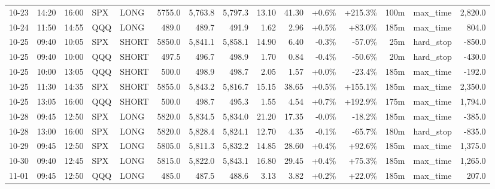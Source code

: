 \documentclass[11pt,a4paper,twoside]{article}
\begin{document}
\begin{landscape}
\begin{center}
\begin{longtable}{>{\color{txtmain}}l l l l l r r r r r r r r >{\color{txtmain}}l r}
10-23 & 14:20 & 16:00 & SPX & LONG & 5755.0 & 5,763.8 & 5,797.3 & 13.10 & 41.30 & \textcolor{wingreen}{+0.6\%} & \textcolor{wingreen}{+215.3\%} & 100m & max\_time & \textcolor{wingreen}{2,820.0} \\
10-24 & 11:50 & 14:55 & QQQ & LONG & 489.0 & 489.7 & 491.9 & 1.62 & 2.96 & \textcolor{wingreen}{+0.5\%} & \textcolor{wingreen}{+83.0\%} & 185m & max\_time & \textcolor{wingreen}{804.0} \\
10-25 & 09:40 & 10:05 & SPX & SHORT & 5850.0 & 5,841.1 & 5,858.1 & 14.90 & 6.40 & \textcolor{lossred}{-0.3\%} & \textcolor{lossred}{-57.0\%} & 25m & hard\_stop & \textcolor{lossred}{-850.0} \\
10-25 & 09:40 & 10:00 & QQQ & SHORT & 497.5 & 496.7 & 498.9 & 1.70 & 0.84 & \textcolor{lossred}{-0.4\%} & \textcolor{lossred}{-50.6\%} & 20m & hard\_stop & \textcolor{lossred}{-430.0} \\
10-25 & 10:00 & 13:05 & QQQ & SHORT & 500.0 & 498.9 & 498.7 & 2.05 & 1.57 & \textcolor{wingreen}{+0.0\%} & \textcolor{lossred}{-23.4\%} & 185m & max\_time & \textcolor{lossred}{-192.0} \\
10-25 & 11:30 & 14:35 & SPX & SHORT & 5855.0 & 5,843.2 & 5,816.7 & 15.15 & 38.65 & \textcolor{wingreen}{+0.5\%} & \textcolor{wingreen}{+155.1\%} & 185m & max\_time & \textcolor{wingreen}{2,350.0} \\
10-25 & 13:05 & 16:00 & QQQ & SHORT & 500.0 & 498.7 & 495.3 & 1.55 & 4.54 & \textcolor{wingreen}{+0.7\%} & \textcolor{wingreen}{+192.9\%} & 175m & max\_time & \textcolor{wingreen}{1,794.0} \\
10-28 & 09:45 & 12:50 & SPX & LONG & 5820.0 & 5,834.5 & 5,834.0 & 21.20 & 17.35 & \textcolor{lossred}{-0.0\%} & \textcolor{lossred}{-18.2\%} & 185m & max\_time & \textcolor{lossred}{-385.0} \\
10-28 & 13:00 & 16:00 & SPX & LONG & 5820.0 & 5,828.4 & 5,824.1 & 12.70 & 4.35 & \textcolor{lossred}{-0.1\%} & \textcolor{lossred}{-65.7\%} & 180m & hard\_stop & \textcolor{lossred}{-835.0} \\
10-29 & 09:45 & 12:50 & SPX & LONG & 5805.0 & 5,811.3 & 5,832.2 & 14.85 & 28.60 & \textcolor{wingreen}{+0.4\%} & \textcolor{wingreen}{+92.6\%} & 185m & max\_time & \textcolor{wingreen}{1,375.0} \\
10-30 & 09:40 & 12:45 & SPX & LONG & 5815.0 & 5,822.0 & 5,843.1 & 16.80 & 29.45 & \textcolor{wingreen}{+0.4\%} & \textcolor{wingreen}{+75.3\%} & 185m & max\_time & \textcolor{wingreen}{1,265.0} \\
11-01 & 09:45 & 12:50 & QQQ & LONG & 485.0 & 487.5 & 488.6 & 3.13 & 3.82 & \textcolor{wingreen}{+0.2\%} & \textcolor{wingreen}{+22.0\%} & 185m & max\_time & \textcolor{wingreen}{207.0} \\

\end{longtable}
\end{center}
\end{landscape}
\end{document}
